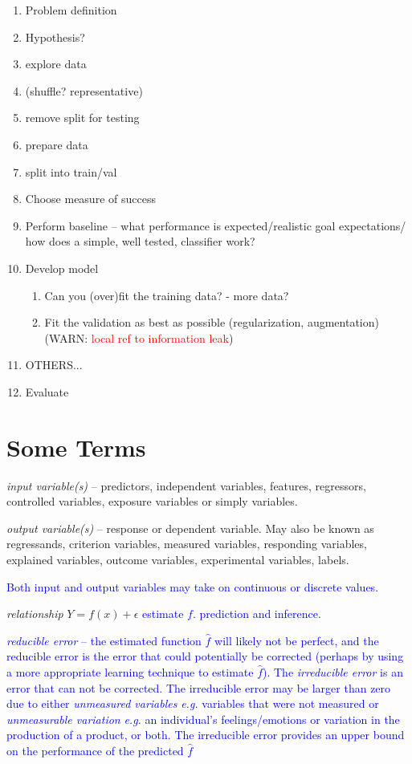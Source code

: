 \begin{enumerate}[noitemsep,topsep=0pt]
	\item Problem definition
	\item Hypothesis?
	\item explore data
	\item (shuffle? representative)
	\item remove split for testing
	\item prepare data
	\item split into train/val
	\item Choose measure of success
	\item Perform baseline -- what performance is expected/realistic goal expectations/ how does a simple, well tested, classifier work?
	\item Develop model
	\begin{enumerate}[noitemsep,topsep=0pt]
		\item Can you (over)fit the training data? - more data?
		\item Fit the validation as best as possible (regularization, augmentation) (WARN: \textcolor{red}{local ref to information leak})
	\end{enumerate}
	\item OTHERS...
	\item Evaluate
\end{enumerate}


\section{Some Terms}

\emph{input variable(s)} -- predictors, independent variables, features, regressors, controlled variables, exposure variables or simply variables.
 
\emph{output variable(s)} -- response or dependent variable. May also be known as regressands, criterion variables, measured variables, responding variables, explained variables, outcome variables, experimental variables, labels.

\textcolor{blue}{Both input and output variables may take on continuous or discrete values.}

\emph{relationship} $Y = f(x) + \epsilon$ \textcolor{blue}{estimate $f$. prediction and inference}.

\textcolor{blue}{\emph{{reducible error}} -- the estimated function $\hat{f}$ will likely not be perfect, and the reducible error is the error that could potentially be corrected (perhaps by using a more appropriate learning technique to estimate $\hat{f}$).  The \emph{irreducible error} is an error that can not be corrected. The irreducible error may be larger than zero due to either \emph{unmeasured variables} \emph{e.g.} variables that were not measured or \emph{unmeasurable variation} \emph{e.g.} an individual's feelings/emotions or variation in the production of a product, or both. The irreducible error provides an upper bound on the performance of the predicted $\hat{f}$}


